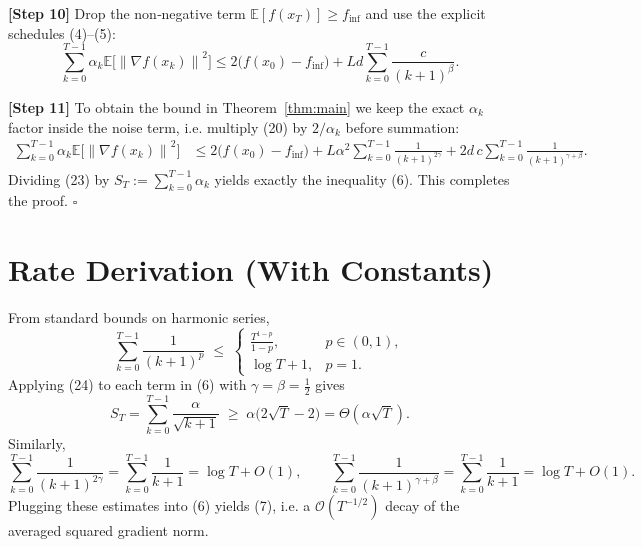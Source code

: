 \documentclass[11pt]{article}
\newcommand{\E}{\mathbb{E}}
\newcommand{\norm}[1]{\left\|#1\right\|}
\begin{document}
\noindent\textbf{[Step 10]} Drop the non‑negative term
$\E[f(x_T)]\ge f_{\inf}$ and use the explicit schedules
(4)–(5):
\[
\sum_{k=0}^{T-1}\alpha_k
   \E\!\bigl[\norm{\nabla f(x_k)}^2\bigr]
\le
2\bigl(f(x_0)-f_{\inf}\bigr)
+L d\sum_{k=0}^{T-1}\frac{c}{(k+1)^{\beta}} .
\tag{22}
\]

\noindent\textbf{[Step 11]} To obtain the bound in Theorem~\ref{thm:main}
we keep the exact $\alpha_k$ factor inside the noise term, i.e.
multiply (20) by $2/\alpha_k$ before summation:
\[
\begin{aligned}
\sum_{k=0}^{T-1}\alpha_k
   \E\!\bigl[\norm{\nabla f(x_k)}^2\bigr]
&\le
2\bigl(f(x_0)-f_{\inf}\bigr)
+L\alpha^2\sum_{k=0}^{T-1}\frac{1}{(k+1)^{2\gamma}}
+2d\,c\sum_{k=0}^{T-1}\frac{1}{(k+1)^{\gamma+\beta}} .
\end{aligned}
\tag{23}
\]
Dividing (23) by $S_T:=\sum_{k=0}^{T-1}\alpha_k$ yields exactly
the inequality (6).  This completes the proof. \hfill $\square$

\section*{Rate Derivation (With Constants)}
From standard bounds on harmonic series,
\[
\sum_{k=0}^{T-1}\frac{1}{(k+1)^{p}}
\;\le\;
\begin{cases}
\displaystyle \frac{T^{1-p}}{1-p}, & p\in(0,1),\\[0.4em]
\displaystyle \log T +1, & p=1 .
\end{cases}
\tag{24}
\]
Applying (24) to each term in (6) with $\gamma=\beta=\tfrac12$ gives
\[
S_T = \sum_{k=0}^{T-1}\frac{\alpha}{\sqrt{k+1}}
      \;\ge\;
\alpha\bigl(2\sqrt{T}-2\bigr) = \Theta(\alpha\sqrt{T}) .
\]
Similarly,
\[
\sum_{k=0}^{T-1}\frac{1}{(k+1)^{2\gamma}}=
\sum_{k=0}^{T-1}\frac{1}{k+1}= \log T + O(1),
\qquad
\sum_{k=0}^{T-1}\frac{1}{(k+1)^{\gamma+\beta}}
 =\sum_{k=0}^{T-1}\frac{1}{k+1}= \log T + O(1).
\]
Plugging these estimates into (6) yields (7), i.e. a
$\mathcal O(T^{-1/2})$ decay of the averaged squared gradient norm.

\end{document}
